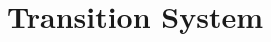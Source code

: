 \documentclass[11pt,letterpaper]{article}
\begin{document}
%
%
%
%
%
%
%
%

\section{Transition System}
\end{document}
